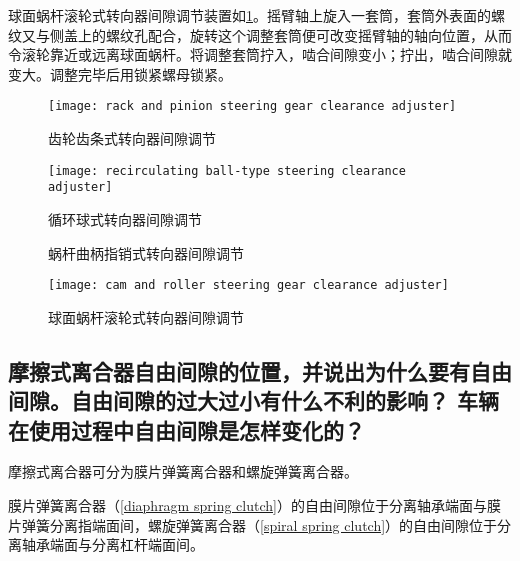 \documentclass[UTF8]{ctexart}
\numberwithin{figure}{section}
\numberwithin{table}{section}
\begin{document}
球面蜗杆滚轮式转向器间隙调节装置如\cref{cam and roller steering gear clearance adjuster}。摇臂轴上旋入一套筒，套筒外表面的螺纹又与侧盖上的螺纹孔配合，旋转这个调整套筒便可改变摇臂轴的轴向位置，从而令滚轮靠近或远离球面蜗杆。将调整套筒拧入，啮合间隙变小；拧出，啮合间隙就变大。调整完毕后用锁紧螺母锁紧。

\begin{figure}[htbp]
	\centering
	\begin{minipage}[b]{0.4\textwidth}
		\centering
		\texttt{[image: rack and pinion steering gear clearance adjuster]}
		\caption{齿轮齿条式转向器间隙调节}
		\label{rack and pinion steering gear clearance adjuster}
	\end{minipage}
	\begin{minipage}[b]{0.5\textwidth}
		\centering
		\texttt{[image: recirculating ball-type steering clearance adjuster]}
		\caption{循环球式转向器间隙调节}
		\label{recirculating ball-type steering clearance adjuster}
	\end{minipage}
	\begin{minipage}[b]{0.6\textwidth}
		\centering
		\caption{蜗杆曲柄指销式转向器间隙调节}
		\label{worm and crankpin steering gear clearance adjuster}
	\end{minipage}
	\begin{minipage}[b]{0.3\textwidth}
		\centering
		\texttt{[image: cam and roller steering gear clearance adjuster]}
		\caption{球面蜗杆滚轮式转向器间隙调节}
		\label{cam and roller steering gear clearance adjuster}
	\end{minipage}
\end{figure}

\subsection{摩擦式离合器自由间隙的位置，并说出为什么要有自由间隙。自由间隙的过大过小有什么不利的影响？ 车辆在使用过程中自由间隙是怎样变化的？}

摩擦式离合器可分为膜片弹簧离合器和螺旋弹簧离合器。

膜片弹簧离合器（\cref{diaphragm spring clutch}）的自由间隙位于分离轴承端面与膜片弹簧分离指端面间，螺旋弹簧离合器（\cref{spiral spring clutch}）的自由间隙位于分离轴承端面与分离杠杆端面间。
\end{document}
